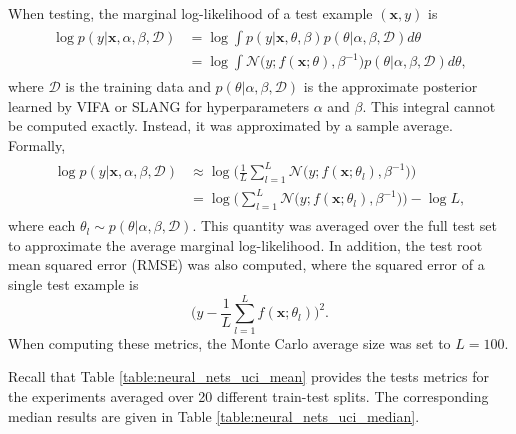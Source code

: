 \documentclass[msc,deptreport.inf]{infthesis} %
\newcommand{\matr}[1]{\mathbf{#1}}
\begin{document}
When testing, the marginal log-likelihood of a test example $(\matr{x}, y)$ is
\begin{align}
\begin{split}
	\log p(y | \matr{x}, \alpha, \beta, \mathcal{D}) 
	& = \log \int p(y | \matr{x}, \theta, \beta) p(\theta | \alpha, \beta, \mathcal{D}) d\theta \\
	& = \log \int \mathcal{N}\big(y; f(\matr{x}; \theta), \beta^{-1}\big) p(\theta | \alpha, \beta, \mathcal{D}) d\theta,
\end{split}
\end{align}
where $\mathcal{D}$ is the training data and $p(\theta | \alpha, \beta, \mathcal{D})$ is the approximate posterior learned by VIFA or SLANG for hyperparameters $\alpha$ and $\beta$. This integral cannot be computed exactly. Instead, it was approximated by a sample average. Formally, 
\begin{align}
\begin{split}
	\log p(y | \matr{x}, \alpha, \beta, \mathcal{D}) 
	& \approx \log \Bigg( \frac{1}{L} \sum_{l=1}^L \mathcal{N}\big(y; f(\matr{x}; \theta_l), \beta^{-1}\big) \Bigg) \\
	& = \log \Bigg( \sum_{l=1}^L \mathcal{N}\big(y; f(\matr{x}; \theta_l), \beta^{-1}\big) \Bigg) - \log L,
\end{split}
\end{align}
where each $\theta_l \sim p(\theta | \alpha, \beta, \mathcal{D})$. This quantity was averaged over the full test set to approximate the average marginal log-likelihood. In addition, the test root mean squared error (RMSE) was also computed, where the squared error of a single test example is
\begin{equation}
	\Bigg(y - \frac{1}{L} \sum_{l=1}^L f(\matr{x}; \theta_l)\Bigg)^2.
\end{equation}
When computing these metrics, the Monte Carlo average size was set to $L=100$.

Recall that Table \ref{table:neural_nets_uci_mean} provides the tests metrics for the experiments averaged over 20 different train-test splits. The corresponding median results are given in Table \ref{table:neural_nets_uci_median}.
\end{document}
